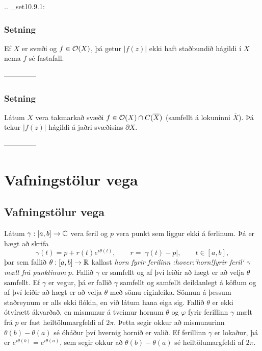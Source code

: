 .. _set10.9.1:

\subsubsection{Setning} 
 Ef $X$ er svæði og $f\in {\cal O}(X)$, þá getur
$|f(z)|$ ekki haft staðbundið hágildi í $X$ nema $f$ sé fastafall.


--------------



\subsubsection{Setning}  Látum $X$ vera takmarkað svæði $f\in
{\cal O}(X)\cap C(\overline X)$ (samfellt á lokuninni $\overline X$).  Þá
tekur $|f(z)|$ hágildi á jaðri svæðisins $\partial X$.


--------------




\section{Vafningstölur vega}

\subsection{Vafningstölur vega}

\noindent
Látum $\gamma:[a,b]\to {\mathbb C}$ vera feril og $p$ vera punkt sem liggur
ekki á ferlinum.  Þá er hægt að skrifa 
 $$\gamma(t)=p+r(t)e^{i\theta(t)}, \qquad r=|\gamma(t)-p|, \qquad t\in [a,b],
 $$
þar sem fallið $\theta:[a,b]\to {\mathbb R}$ kallast  {\it horn fyrir
ferilinn :hover:`horn!fyrir feril` $\gamma$ mælt frá punktinum} $p$.
Fallið $\gamma$ er samfellt og af því leiðir að hægt er að velja
$\theta$ samfellt.  Ef $\gamma$ er vegur, þá er fallið $\gamma$
samfellt og samfellt deildanlegt á köflum og af því leiðir að hægt er
að velja $\theta$ með sömu eiginleika.  Sönnun á þessum staðreynum er
alls ekki flókin, en við látum hana eiga sig.  Fallið $\theta$ er ekki
ótvírætt ákvarðað, en mismunur á tveimur hornum $\theta$ og $\varphi$
fyrir ferillinn $\gamma$ mælt frá $p$ er fast heiltölumargfeldi af
$2\pi$. Þetta segir okkur að mismunurinn $\theta(b)-\theta(a)$ sé
óháður því hvernig hornið er valið. Ef ferillinn $\gamma$ er lokaður,
þá er $e^{i\theta(b)}=e^{i\theta(a)}$, sem segir okkur að
$\theta(b)-\theta(a)$ sé heiltölumargfeldi af $2\pi$.

